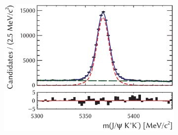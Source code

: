 \begin{figure}[p]
  \centering
  \begin{subfigure}{0.65\textwidth}
    \includegraphics[width=\textwidth]{graphics/analysis/JpsiKKMass_DG_bkgSub_lin_resid}
    \caption{}
    \label{fig:JpsiKKMass_I2_lin}
  \end{subfigure}


\end{figure}
